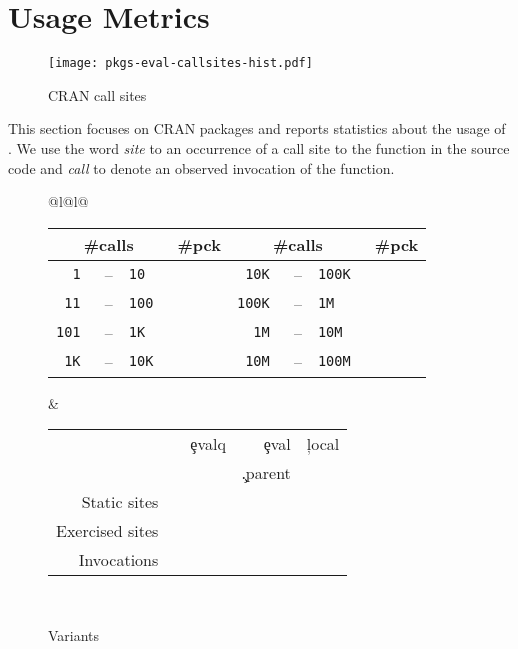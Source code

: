 \documentclass[review,screen,acmsmall,anonymous=true]{acmart}
\begin{document}
\section{Usage Metrics}

\begin{wrapfigure}{r}{5cm} \vspace{-1cm} \hspace*{-12mm}
  \centering
  \texttt{[image: pkgs-eval-callsites-hist.pdf]} \caption{CRAN
  \eval call sites}%
  \label{fig:pkgs-eval-callsites-hist}\vspace{-3mm}
\end{wrapfigure}
%
This section focuses on CRAN packages and reports statistics about the usage of
\eval. We use the word \emph{site} to an occurrence of a call site to the \eval
function in the source code and \emph{call} to denote an observed invocation of
the \eval function.

\begin{figure}[!b]
\small
\begin{tabular}{@{}l@{\hspace{1.5cm}}l@{}}
\begin{minipage} {5cm}\small
  \begin{tabular}{|r@{\,}r@{\,}l@{}r|r@{\,}r@{\,}l@{}r|} \hline
    \multicolumn{3}{|c}{\small\#calls} &\small \#pck
&     \multicolumn{3}{c}{\small\#calls} &\small\#pck \\\hline
\tt 1 &--& \tt 10      & \packageBina  & \tt 10K &--&\tt 100K  & \packageBine\\
\tt 11 &--& \tt 100    & \packageBinb  & \tt 100K &--&\tt 1M  & \packageBinf\\
\tt 101 &--& \tt 1K    & \packageBinc  & \tt 1M &--&\tt 10M   & \packageBing\\
\tt 1K &--& \tt 10K    & \packageBind  & \tt 10M &--& \tt 100M & \packageBinh\\\hline
\end{tabular}
\caption{Call frequency}\label{freq}
\end{minipage}
&
\begin{minipage}{7cm}\small
\begin{tabular}{|@{\,}r|rrrr|}\hline
  &\eval & \c{evalq} & \c{eval} & \c{local}\\[-1.5mm]
           & & & \c{.parent} &\\\hline
\small Static sites &\packageStaticeval&\packageStaticevalq&\packageStaticevalparent&\packageStaticlocal \\
\small Exercised sites&\packageTriggeredeval&\packageTriggeredevalq&\packageTriggeredevalparent&\packageTriggeredlocal\\
\small Invocations&\packageEvalsRnd&\packageEvalqsRnd&\packageEparentsRnd&\packageLocalsRnd\\\hline
\end{tabular}~\\[2mm]\caption{Variants}\label{tab:variantseval}
\end{minipage}\end{tabular}

\end{figure}
\end{document}
